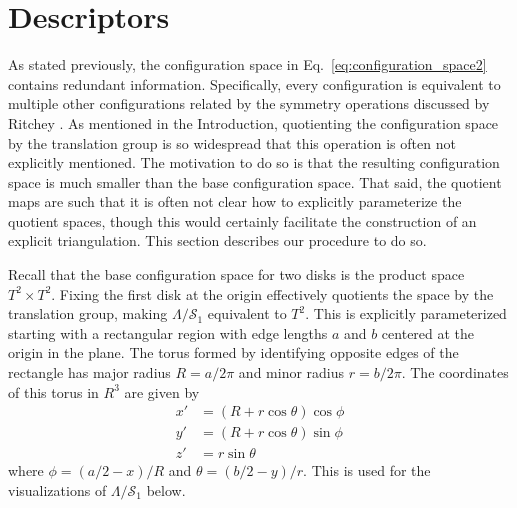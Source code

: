 \documentclass[default,iicol]{sn-jnl}%
\theoremstyle{thmstyleone}%
\theoremstyle{thmstyletwo}%
\theoremstyle{thmstylethree}%
\begin{document}
\section{Descriptors}
\label{sec:descriptors}

As stated previously, the configuration space in Eq.\ \ref{eq:configuration_space2} contains redundant information. Specifically, every configuration is equivalent to multiple other configurations related by the symmetry operations discussed by Ritchey \cite{ritcheyphd}. As mentioned in the Introduction, quotienting the configuration space by the translation group is so widespread that this operation is often not explicitly mentioned. The motivation to do so is that the resulting configuration space is much smaller than the base configuration space. That said, the quotient maps are such that it is often not clear how to explicitly parameterize the quotient spaces, though this would certainly facilitate the construction of an explicit triangulation. This section describes our procedure to do so.

Recall that the base configuration space for two disks is the product space $T^2 \times T^2$. Fixing the first disk at the origin effectively quotients the space by the translation group, making $\Lambda/\mathcal{S}_1$ equivalent to $T^2$. This is explicitly parameterized starting with a rectangular region with edge lengths $a$ and $b$ centered at the origin in the plane. The torus formed by identifying opposite edges of the rectangle has major radius $R = a / 2 \pi$ and minor radius $r = b / 2 \pi$. The coordinates of this torus in $R^3$ are given by
\begin{align*}
	x' &=  (R + r \cos\theta) \cos\phi \nonumber \\
	y' &= (R + r \cos\theta) \sin\phi \nonumber \\
	z' &= r \sin\theta  \label{eq:torus_mapping}
\end{align*}
where $\phi = (a / 2 - x) / R$ and $\theta = (b / 2 - y) / r$. This is used for the visualizations of $\Lambda/\mathcal{S}_1$ below.
\end{document}
